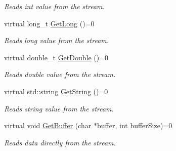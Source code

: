 \begin{DoxyCompactItemize}
\begin{DoxyCompactList}\small\item\em Reads int value from the stream. \end{DoxyCompactList}\item 
\hypertarget{class_common_1_1_de_serializer_a1c869a74ee3d1106a26a425448192563}{virtual long\-\_\-t \hyperlink{class_common_1_1_de_serializer_a1c869a74ee3d1106a26a425448192563}{Get\-Long} ()=0}\label{class_common_1_1_de_serializer_a1c869a74ee3d1106a26a425448192563}

\begin{DoxyCompactList}\small\item\em Reads long value from the stream. \end{DoxyCompactList}\item 
\hypertarget{class_common_1_1_de_serializer_adda6f9a260dcd3f0c925799448364b70}{virtual double\-\_\-t \hyperlink{class_common_1_1_de_serializer_adda6f9a260dcd3f0c925799448364b70}{Get\-Double} ()=0}\label{class_common_1_1_de_serializer_adda6f9a260dcd3f0c925799448364b70}

\begin{DoxyCompactList}\small\item\em Reads double value from the stream. \end{DoxyCompactList}\item 
\hypertarget{class_common_1_1_de_serializer_adbee4f2d29abe1ab78e16d5c30afe8dd}{virtual std\-::string \hyperlink{class_common_1_1_de_serializer_adbee4f2d29abe1ab78e16d5c30afe8dd}{Get\-String} ()=0}\label{class_common_1_1_de_serializer_adbee4f2d29abe1ab78e16d5c30afe8dd}

\begin{DoxyCompactList}\small\item\em Reads string value from the stream. \end{DoxyCompactList}\item 
\hypertarget{class_common_1_1_de_serializer_a6659c1a1cf712983d088931be967f284}{virtual void \hyperlink{class_common_1_1_de_serializer_a6659c1a1cf712983d088931be967f284}{Get\-Buffer} (char $\ast$buffer, int buffer\-Size)=0}\label{class_common_1_1_de_serializer_a6659c1a1cf712983d088931be967f284}

\begin{DoxyCompactList}\small\item\em Reads data directly from the stream. \end{DoxyCompactList}\end{DoxyCompactItemize}


